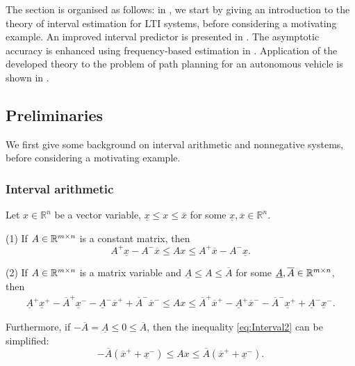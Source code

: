 The section is organised as follows: in , we start by giving an introduction to the theory of interval estimation for \gls{LTI} systems, before considering a motivating example. An improved interval predictor is presented in . The asymptotic accuracy is enhanced using frequency-based estimation in . Application of the developed theory to the problem of path planning for an autonomous vehicle is shown in .

\subsection{Preliminaries}
\label{sec:interval-preliminaries}

We first give some background on interval arithmetic and nonnegative systems, before considering a motivating example.

\subsubsection{Interval arithmetic}

\begin{lemma}
	\label{lem:interval}
	Let $x\in\mathbb{R}^{n}$ be a vector variable, $\underline{x}\le x\le\overline{x}$ for some $\underline{x},\overline{x}\in\mathbb{R}^{n}$. 
	
	\textup{(1)} If $A\in\mathbb{R}^{m\times n}$ is a constant matrix, then
	\begin{equation}
	A^{+}\underline{x}-A^{-}\overline{x}\le Ax\le A^{+}\overline{x}-A^{-}\underline{x}.\label{eq:Interval1}
	\end{equation}
	
	\textup{(2)} If $A\in\mathbb{R}^{m\times n}$ is a matrix variable and \textup{$\underline{A}\le A\le\overline{A}$} for some $\underline{A},\overline{A}\in\mathbb{R}^{m\times n}$, then
	\begin{gather}
	\underline{A}^{+}\underline{x}^{+}-\overline{A}^{+}\underline{x}^{-}-\underline{A}^{-}\overline{x}^{+}+\overline{A}^{-}\overline{x}^{-}\leq Ax\label{eq:Interval2}
	\leq\overline{A}^{+}\overline{x}^{+}-\underline{A}^{+}\overline{x}^{-}-\overline{A}^{-}\underline{x}^{+}+\underline{A}^{-}\underline{x}^{-}. 
	\end{gather}
\end{lemma}
Furthermore, if $-\overline{A}=\underline{A}\le0\le\overline{A}$, then the inequality \eqref{eq:Interval2} can be simplified: $$-\overline{A}(\overline{x}^{+}+\underline{x}^{-})\leq Ax\leq\overline{A}(\overline{x}^{+}+\underline{x}^{-}).$$

